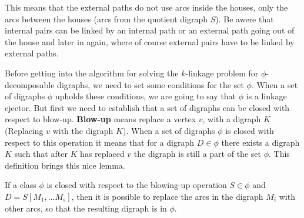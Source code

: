 This means that the external paths do not use arcs inside the houses, only the arcs between the houses (arcs from the quotient digraph $S$). 
Be awere that internal pairs can be linked by an internal path or an external path going out of the house and later in again, where of course external pairs have to be linked by external paths. 

Before getting into the algorithm for solving the $k$-linkage problem for $\phi$-decomposable digraphs, we need to set some conditions for the set $\phi$. 
When a set of digraphs $\phi$ upholds these conditions, we are going to say that $\phi$ is a linkage ejector. 
But first we need to establish that a set of digraphs can be closed with respect to blow-up.
\textbf{Blow-up} means replace a vertex $v$, with a digraph $K$ (Replacing $v$ with the digraph $K$).
When a set of digraphs $\phi$ is closed with respect to this operation it means that for a digraph $D\in \phi$ there exists a digraph $K$ such that after $K$ has replaced $v$ the digraph is still a part of the set $\phi$. 
This definition brings this nice lemma.

\begin{lemma}
    If a class $\phi$ is closed with respect to the blowing-up operation $S\in \phi$ and $D=S[M_1,\dots M_s]$, then it is possible to replace the arcs in the digraph $M_i$ with other arcs, so that the resulting digraph is in $\phi$. 
    \label{lemma:replace} 
\end{lemma}

